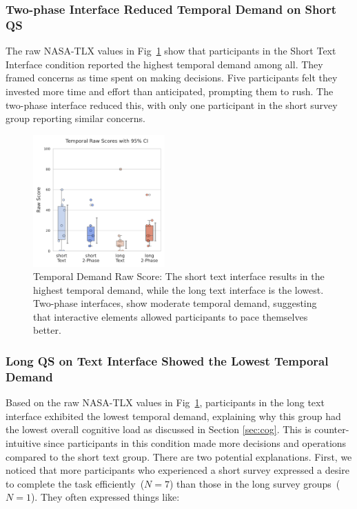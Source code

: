 \subsubsection{Two-phase Interface Reduced Temporal Demand on Short QS} The raw NASA-TLX values in Fig~\ref{fig:temporal_cog_score} show that participants in the Short Text Interface condition reported the highest temporal demand among all. They framed concerns as time spent on making decisions. Five participants felt they invested more time and effort than anticipated, prompting them to rush. The two-phase interface reduced this, with only one participant in the short survey group reporting similar concerns.

\begin{figure} %
    \centering
    \includegraphics[width=0.45\textwidth, trim=0 13 0 13, clip]{content/image/cog/Temporal_scores.pdf}
    \captionsetup{width=0.45\textwidth, justification=justified} %
    \caption{Temporal Demand Raw Score: The short text interface results in the highest temporal demand, while the long text interface is the lowest. Two-phase interfaces, show moderate temporal demand, suggesting that interactive elements allowed participants to pace themselves better.}
    \label{fig:temporal_cog_score}
\end{figure}

\subsubsection{Long QS on Text Interface Showed the Lowest Temporal Demand} Based on the raw NASA-TLX values in Fig~\ref{fig:temporal_cog_score}, participants in the long text interface exhibited the lowest temporal demand, explaining why this group had the lowest overall cognitive load 
as discussed in Section \ref{sec:cog}. This is counter-intuitive since participants in this condition made more decisions and operations compared to the short text group. There are two potential explanations. First, we noticed that more participants who experienced a short survey expressed a desire to complete the task efficiently~($N=7$) than those in the long survey groups~($N=1$). They often expressed things like:

